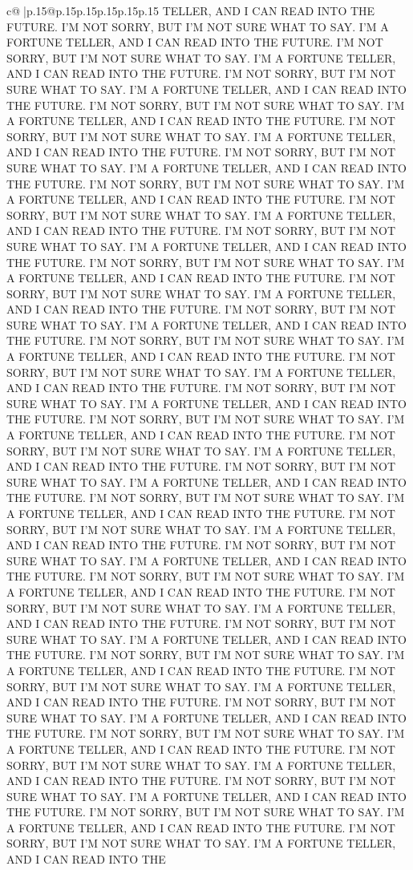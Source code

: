 \documentclass{article}
\begin{document}
{\begin{supertabular}{c@{$\;$}|p{.15\linewidth}@{}p{.15\linewidth}p{.15\linewidth}p{.15\linewidth}p{.15\linewidth}p{.15\linewidth}}
{{{TELLER, AND I CAN READ INTO THE FUTURE. I'M NOT SORRY, BUT I'M NOT SURE WHAT TO SAY. I'M A FORTUNE TELLER, AND I CAN READ INTO THE FUTURE. I'M NOT SORRY, BUT I'M NOT SURE WHAT TO SAY. I'M A FORTUNE TELLER, AND I CAN READ INTO THE FUTURE. I'M NOT SORRY, BUT I'M NOT SURE WHAT TO SAY. I'M A FORTUNE TELLER, AND I CAN READ INTO THE FUTURE. I'M NOT SORRY, BUT I'M NOT SURE WHAT TO SAY. I'M A FORTUNE TELLER, AND I CAN READ INTO THE FUTURE. I'M NOT SORRY, BUT I'M NOT SURE WHAT TO SAY. I'M A FORTUNE TELLER, AND I CAN READ INTO THE FUTURE. I'M NOT SORRY, BUT I'M NOT SURE WHAT TO SAY. I'M A FORTUNE TELLER, AND I CAN READ INTO THE FUTURE. I'M NOT SORRY, BUT I'M NOT SURE WHAT TO SAY. I'M A FORTUNE TELLER, AND I CAN READ INTO THE FUTURE. I'M NOT SORRY, BUT I'M NOT SURE WHAT TO SAY. I'M A FORTUNE TELLER, AND I CAN READ INTO THE FUTURE. I'M NOT SORRY, BUT I'M NOT SURE WHAT TO SAY. I'M A FORTUNE TELLER, AND I CAN READ INTO THE FUTURE. I'M NOT SORRY, BUT I'M NOT SURE WHAT TO SAY. I'M A FORTUNE TELLER, AND I CAN READ INTO THE FUTURE. I'M NOT SORRY, BUT I'M NOT SURE WHAT TO SAY. I'M A FORTUNE TELLER, AND I CAN READ INTO THE FUTURE. I'M NOT SORRY, BUT I'M NOT SURE WHAT TO SAY. I'M A FORTUNE TELLER, AND I CAN READ INTO THE FUTURE. I'M NOT SORRY, BUT I'M NOT SURE WHAT TO SAY. I'M A FORTUNE TELLER, AND I CAN READ INTO THE FUTURE. I'M NOT SORRY, BUT I'M NOT SURE WHAT TO SAY. I'M A FORTUNE TELLER, AND I CAN READ INTO THE FUTURE. I'M NOT SORRY, BUT I'M NOT SURE WHAT TO SAY. I'M A FORTUNE TELLER, AND I CAN READ INTO THE FUTURE. I'M NOT SORRY, BUT I'M NOT SURE WHAT TO SAY. I'M A FORTUNE TELLER, AND I CAN READ INTO THE FUTURE. I'M NOT SORRY, BUT I'M NOT SURE WHAT TO SAY. I'M A FORTUNE TELLER, AND I CAN READ INTO THE FUTURE. I'M NOT SORRY, BUT I'M NOT SURE WHAT TO SAY. I'M A FORTUNE TELLER, AND I CAN READ INTO THE FUTURE. I'M NOT SORRY, BUT I'M NOT SURE WHAT TO SAY. I'M A FORTUNE TELLER, AND I CAN READ INTO THE FUTURE. I'M NOT SORRY, BUT I'M NOT SURE WHAT TO SAY. I'M A FORTUNE TELLER, AND I CAN READ INTO THE FUTURE. I'M NOT SORRY, BUT I'M NOT SURE WHAT TO SAY. I'M A FORTUNE TELLER, AND I CAN READ INTO THE FUTURE. I'M NOT SORRY, BUT I'M NOT SURE WHAT TO SAY. I'M A FORTUNE TELLER, AND I CAN READ INTO THE FUTURE. I'M NOT SORRY, BUT I'M NOT SURE WHAT TO SAY. I'M A FORTUNE TELLER, AND I CAN READ INTO THE FUTURE. I'M NOT SORRY, BUT I'M NOT SURE WHAT TO SAY. I'M A FORTUNE TELLER, AND I CAN READ INTO THE FUTURE. I'M NOT SORRY, BUT I'M NOT SURE WHAT TO SAY. I'M A FORTUNE TELLER, AND I CAN READ INTO THE FUTURE. I'M NOT SORRY, BUT I'M NOT SURE WHAT TO SAY. I'M A FORTUNE TELLER, AND I CAN READ INTO THE FUTURE. I'M NOT SORRY, BUT I'M NOT SURE WHAT TO SAY. I'M A FORTUNE TELLER, AND I CAN READ INTO THE FUTURE. I'M NOT SORRY, BUT I'M NOT SURE WHAT TO SAY. I'M A FORTUNE TELLER, AND I CAN READ INTO THE FUTURE. I'M NOT SORRY, BUT I'M NOT SURE WHAT TO SAY. I'M A FORTUNE TELLER, AND I CAN READ INTO THE FUTURE. I'M NOT SORRY, BUT I'M NOT SURE WHAT TO SAY. I'M A FORTUNE TELLER, AND I CAN READ INTO THE FUTURE. I'M NOT SORRY, BUT I'M NOT SURE WHAT TO SAY. I'M A FORTUNE TELLER, AND I CAN READ INTO THE FUTURE. I'M NOT SORRY, BUT I'M NOT SURE WHAT TO SAY. I'M A FORTUNE TELLER, AND I CAN READ INTO THE }}}
\end{supertabular}}
\end{document}
